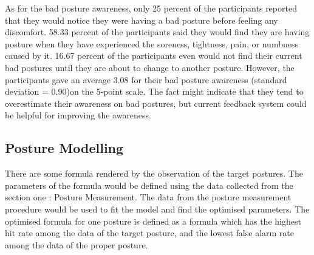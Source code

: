 As for the bad posture awareness, only 25 percent of the participants reported that they would notice they were having a bad posture before feeling any discomfort. 58.33 percent of the participants said they would find they are having posture when they have experienced the soreness, tightness, pain, or numbness caused by it. 16.67 percent of the participants even would not find their current bad postures until they are about to change to another posture. However, the participants gave an average 3.08 for their bad posture awareness (standard deviation = 0.90)on the 5-point scale. The fact might indicate that they tend to overestimate their awareness on bad postures, but current feedback system could be helpful for improving the awareness.

\subsection{Posture Modelling}
There are some formula rendered by the observation of the target postures. The parameters of the formula would be defined using the data collected from the section one : Posture Measurement. The data from the posture measurement procedure would be used to fit the model and find the optimised parameters. The optimised formula for one posture is defined as a formula which has the highest hit rate among the data of the target posture, and the lowest false alarm rate among the data of the proper posture.


